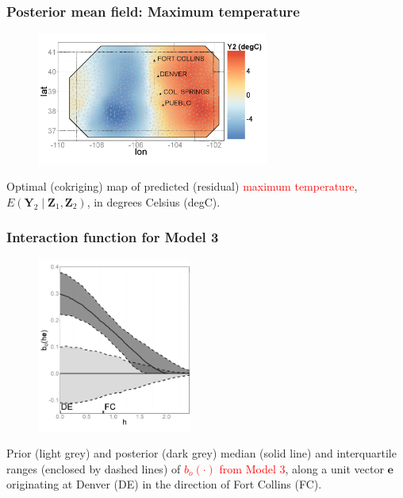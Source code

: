 \documentclass{beamer}
\newcommand{\Yvec}{\mathbf{Y}}
\newcommand{\Zvec}{\mathbf{Z}}
\newcommand{\E}{E}
\begin{document}

\begin{frame}
\frametitle{Posterior mean field: Maximum temperature}
\begin{figure}
\includegraphics[width=3in]{Fig3a2.png}
\end{figure}
\vspace{-.5cm}
Optimal (cokriging) map of predicted (residual) \textcolor{red}{maximum temperature}, $\E(\Yvec_2 \mid  \Zvec_1,\Zvec_2)$, in degrees Celsius (degC).
\end{frame}


\begin{frame}
\frametitle{Interaction function for Model 3}
\vspace{-0.2in}
\begin{figure}
\includegraphics[width=2in]{Fig3b.png}
\end{figure}
\vspace{-.5cm}
\small{Prior (light grey) and posterior (dark grey) median (solid line) and interquartile ranges (enclosed by dashed lines) of \textcolor{red}{$b_o(\cdot)$ from Model 3}, along a unit vector $\mathbf{e}$ originating at Denver (DE) in the direction of Fort Collins (FC).}
\end{frame}

\end{document}
